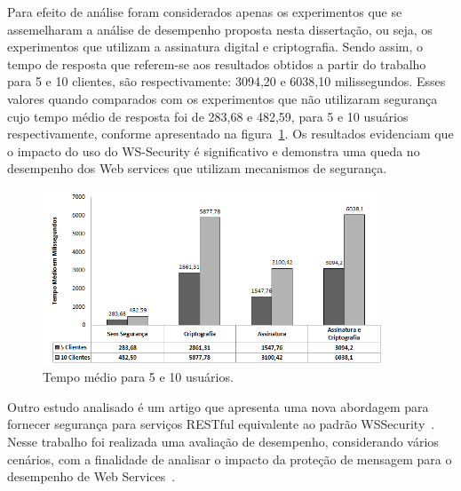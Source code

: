 Para efeito de análise foram considerados apenas os experimentos que se assemelharam a análise de desempenho proposta nesta dissertação, ou seja, os experimentos que utilizam a assinatura digital e criptografia.  Sendo assim, o tempo de resposta  que referem-se aos resultados obtidos a partir do trabalho~\cite{rodrigues2011analysis} para  5 e 10 clientes, são respectivamente: 3094,20 e 6038,10 milissegundos. Esses valores quando comparados com os experimentos que não utilizaram segurança cujo tempo médio de resposta foi de 283,68 e  482,59,  para 5 e 10 usuários respectivamente, conforme apresentado na figura~\ref{fig:comparativowssecurity}. Os resultados  evidenciam que o impacto do uso do WS-Security é significativo e demonstra uma queda no desempenho dos Web services que utilizam mecanismos de segurança.


\begin{figure}[!htb]
    \centering
    \includegraphics[width=0.9\textwidth]{comparativowssecurity.png}
    \caption{Tempo médio para 5 e 10 usuários.}
    \label{fig:comparativowssecurity}
\end{figure}

Outro estudo analisado é um artigo que apresenta uma nova abordagem para fornecer segurança para serviços RESTful equivalente ao padrão WSSecurity~\cite{verstichel}. Nesse trabalho foi realizada uma avaliação de desempenho, considerando vários cenários, com a finalidade de analisar o impacto da proteção de mensagem para o desempenho de Web Services~\cite{verstichel}.

